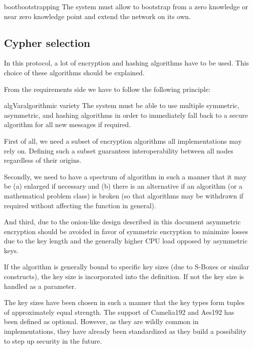 \begin{requirement}{boot}{bootstrapping}
	The system must allow to bootstrap from a zero knowledge or near zero knowledge point and extend the network on its own. 
\end{requirement}

\subsection{Cypher selection}
In this protocol, a lot of encryption and hashing algorithms have to be used. This choice of these algorithms should be explained. 

From the requirements side we have to follow the following principle:
\begin{requirement}{algVar}{algorithmic variety}
	The system must be able to use multiple symmetric, asymmetric, and hashing algorithms in order to immediately fall back to a secure algorithm for all new messages if required. 
\end{requirement}

First of all, we need a subset of encryption algorithms all implementations may rely on. Defining such a subset guarantees interoperability between all nodes regardless of their origins. 

Secondly, we need to have a spectrum of algorithm in such a manner that it may be (a) enlarged if necessary and (b) there is an alternative if an algorithm (or a mathematical problem class) is broken (so that algorithms may be withdrawn if required without affecting the function in general). 

And third, due to the onion-like design described in this document asymmetric encryption should be avoided in favor of symmetric encryption to minimize losses due to the key length and the generally higher CPU load opposed by asymmetric keys.

If the algorithm is generally bound to specific key sizes (due to S-Boxes or similar constructs), the key size is incorporated into the definition. If not the key size is handled as a parameter.

The key sizes have been chosen in such a manner that the key types form tuples of approximately equal strength. The support of Camelia192 and Aes192 has been defined as optional. However, as they are wildly common in implementations, they have already been standardized as they build a possibility to step up security in the future.

